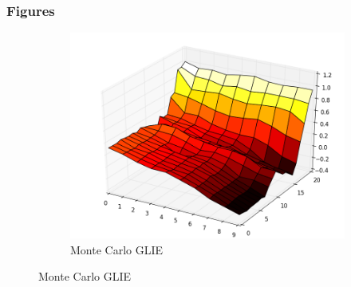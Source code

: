 \documentclass[12pt,a4paper]{article}
\begin{document}
{\subsubsection{Figures}
\begin{figure}
	\begin{subfigure}{.4\textwidth}
		\centering
		\label{E21_MC_V}
		\centering
		\includegraphics[width=.8\linewidth]{Easy21_Results/MC_value_1e6.png}
		\caption{Monte Carlo GLIE}
	\end{subfigure}%
	

\end{figure}}
\end{document}
